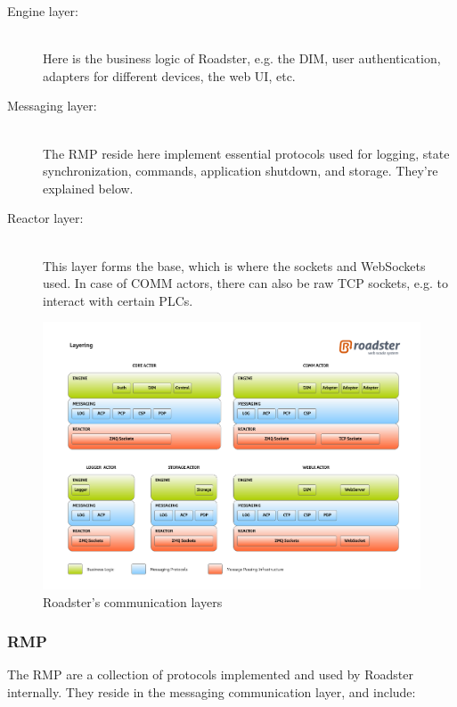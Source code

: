 \begin{description}
	\item [Engine layer:]\hfill\\
		Here is the business logic of Roadster, e.g. the \gls{DIM},
		user authentication, adapters for different devices, the web
		\gls{UI}, etc.

	\item [Messaging layer:]\hfill\\
		The \gls{RMP} reside here implement essential protocols used
		for logging, state synchronization, commands, application
		shutdown, and storage. They're explained below.

	\item [Reactor layer:]\hfill\\
		This layer forms the base, which is where the \zmq sockets and
		WebSockets used. In case of COMM actors, there can also be raw
		TCP sockets, e.g. to interact with certain \glspl{PLC}.
\end{description}

\begin{figure}[!ht]
	\includegraphics[trim=1.95cm 2.5cm 1.65cm 2.8cm, clip=true, width=\textwidth]{img/roadster_layering.pdf}
	\caption{Roadster's communication layers}
	\label{fig:roadster:layers}
\end{figure}

\subsubsection{RMP}
The \gls{RMP} are a collection of protocols implemented and used by Roadster
internally. They reside in the messaging communication layer, and include:

